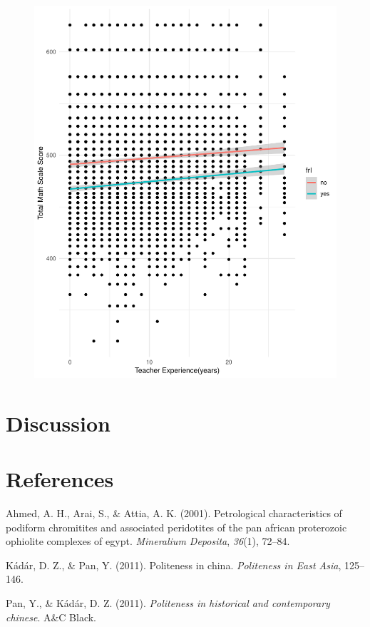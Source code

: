 \documentclass[man]{apa6}
\begin{document}
\begin{figure}
\centering
\includegraphics{lab8-Heidi-Jeongim-Jungah_files/figure-latex/Commit 5-1.pdf}
\caption{}
\end{figure}

\section{Discussion}\label{discussion}

\newpage

\section{References}\label{references}

\begingroup
\setlength{\parindent}{-0.5in} \setlength{\leftskip}{0.5in}

\hypertarget{refs}{}
\hypertarget{ref-ahmed2001}{}
Ahmed, A. H., Arai, S., \& Attia, A. K. (2001). Petrological
characteristics of podiform chromitites and associated peridotites of
the pan african proterozoic ophiolite complexes of egypt.
\emph{Mineralium Deposita}, \emph{36}(1), 72--84.

\hypertarget{ref-kadar2011}{}
Kádár, D. Z., \& Pan, Y. (2011). Politeness in china. \emph{Politeness
in East Asia}, 125--146.

\hypertarget{ref-pan2011}{}
Pan, Y., \& Kádár, D. Z. (2011). \emph{Politeness in historical and
contemporary chinese}. A\&C Black.

\endgroup
\end{document}
